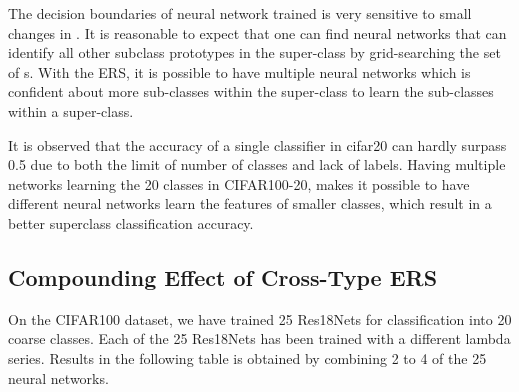 \documentclass[10pt,twocolumn,letterpaper]{article}
\begin{document}
The decision boundaries of neural network trained is very sensitive to small changes in . It is reasonable to expect that one can find neural networks that can identify all other subclass prototypes in the super-class by grid-searching the set of s. With the ERS, it is possible to have multiple neural networks which is confident about more sub-classes within the super-class to learn the sub-classes within a super-class. 

It is observed that the accuracy of a single classifier in cifar20 can hardly surpass 0.5 due to both the limit of number of classes and lack of labels. Having multiple networks learning the 20 classes in CIFAR100-20, makes it possible to have different neural networks learn the features of smaller classes, which result in a better superclass classification accuracy.   

\subsection{Compounding Effect of Cross-Type ERS}
On the CIFAR100 dataset, we have trained 25 Res18Nets for classification into 20 coarse classes. Each of the 25 Res18Nets has been trained with a different lambda series. Results in the following table is obtained by combining 2 to 4 of the 25 neural networks. 
\end{document}
